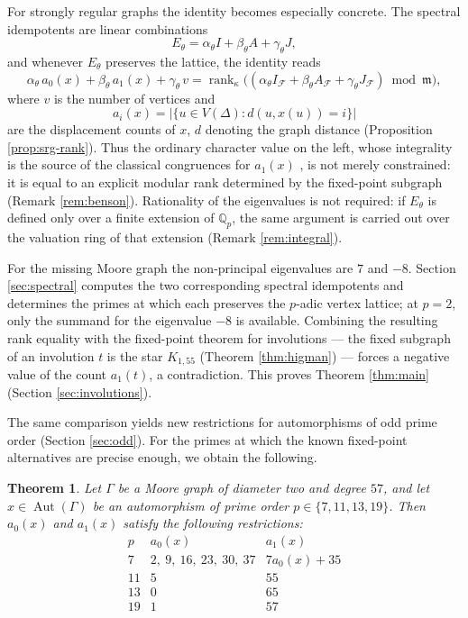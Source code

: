 \documentclass[11pt]{article}
\theoremstyle{plain}
\newtheorem{theorem}{Theorem}[section]
\theoremstyle{remark}
\newcommand{\Aut}{\operatorname{Aut}}
\newcommand{\rank}{\operatorname{rank}}
\newcommand{\Qp}{\mathbb Q_p}
\begin{document}
For strongly regular graphs the identity becomes especially concrete.
The spectral idempotents are linear combinations
\[
 E_\theta=\alpha_\theta I+\beta_\theta A+\gamma_\theta J,
\]
and whenever $E_\theta$ preserves the lattice, the identity reads
\[
 \alpha_\theta\, a_0(x)+\beta_\theta\, a_1(x)+\gamma_\theta\, v
 =\rank_{\kappa}\bigl((\alpha_\theta I_{\mathcal F}+\beta_\theta A_{\mathcal F}+\gamma_\theta J_{\mathcal F})\bmod \mathfrak m\bigr),
\]
where $v$ is the number of vertices and
\[
 a_i(x)=\left|\{u\in V(\Delta):d(u,x(u))=i\}\right|
\]
are the displacement counts of $x$, $d$ denoting the graph distance (Proposition \ref{prop:srg-rank}).
Thus the ordinary character value on the left,
whose integrality is the source of the classical congruences for $a_1(x)$ \cite{MacajSiran,DeWinterKamischkeWang},
is not merely constrained: it is equal to an explicit modular rank determined by the fixed-point subgraph (Remark \ref{rem:benson}).
Rationality of the eigenvalues is not required: if $E_\theta$ is defined only over a finite extension of $\Qp$,
the same argument is carried out over the valuation ring of that extension (Remark \ref{rem:integral}).

For the missing Moore graph the non-principal eigenvalues are $7$ and $-8$.
Section \ref{sec:spectral} computes the two corresponding spectral idempotents and determines the primes at which each preserves the $p$-adic vertex lattice;
at $p=2$, only the summand for the eigenvalue $-8$ is available.
Combining the resulting rank equality with the fixed-point theorem for involutions
--- the fixed subgraph of an involution $t$ is the star $K_{1,55}$ (Theorem \ref{thm:higman}) ---
forces a negative value of the count $a_1(t)$, a contradiction.
This proves Theorem \ref{thm:main} (Section \ref{sec:involutions}).

The same comparison yields new restrictions for automorphisms of odd prime order (Section \ref{sec:odd}).
For the primes at which the known fixed-point alternatives are precise enough, we obtain the following.

\begin{theorem}\label{thm:odd}
Let $\Gamma$ be a Moore graph of diameter two and degree $57$,
and let $x\in\Aut(\Gamma)$ be an automorphism of prime order $p\in\{7,11,13,19\}$.
Then $a_0(x)$ and $a_1(x)$ satisfy the following restrictions:
\[
\begin{array}{c|c|c}
 p & a_0(x) & a_1(x) \\
\hline
 7 & 2,\ 9,\ 16,\ 23,\ 30,\ 37 & 7a_0(x)+35 \\
 11 & 5 & 55 \\
 13 & 0 & 65 \\
 19 & 1 & 57
\end{array}
\]
\end{theorem}
\end{document}
